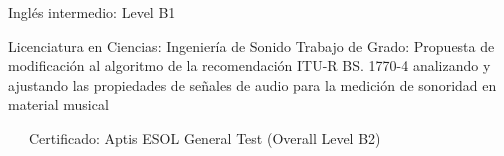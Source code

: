 
{Inglés intermedio: Level B1} %
{ %
}

{Licenciatura en Ciencias: Ingeniería de Sonido} %
{ %
    Trabajo de Grado: Propuesta de modificación al algoritmo de la recomendación ITU-R BS. 1770-4 analizando y ajustando las propiedades de señales de audio para la medición de sonoridad en material musical
}

\vspace*{6pt}
{~~~Certificado: Aptis ESOL General Test (Overall Level B2)} %
{ %
}